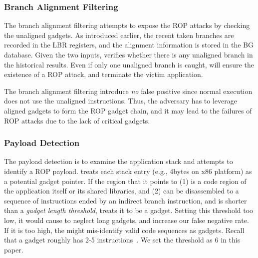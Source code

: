 \subsubsection{Branch Alignment Filtering}\label{sec:alignment}
The branch alignment filtering attempts to expose the ROP attacks by checking the unaligned gadgets.
As introduced earlier, the recent taken branches are recorded in the LBR registers,
and the alignment information is stored in the BG database.
Given the two inputs, \name verifies whether there is any unaligned branch in the historical results.
Even if only one unaligned branch is caught, \name will ensure the existence of a ROP attack, and terminate the victim application.

The branch alignment filtering introduce \emph{no} false positive
since normal execution does not use the unaligned instructions.
Thus, the adversary has to leverage aligned gadgets to form the ROP gadget chain,
and it may lead to the failures of ROP attacks due to the lack of critical gadgets.


\subsubsection{Payload Detection}\label{sec:payload}
The payload detection is to examine the application stack and attempts to
identify a ROP payload. \name treats each stack entry (e.g., 4bytes on x86 platform) as a potential
gadget pointer. If the region that it points to (1) is a code region of
the application itself or its shared libraries, and (2) can be disassembled
to a sequence of instructions ended by an indirect branch instruction, and
is shorter than a {\em gadget length threshold}, \name treats it to be a gadget. Setting this threshold too low,
it would cause \name to neglect long gadgets, and increase our false negative
rate. If it is too high, the \name might mis-identify valid code sequences as
gadgets. Recall that a gadget roughly has 2-5
instructions~\cite{tc-ret2lic}. We set the threshold as 6 in this paper.

